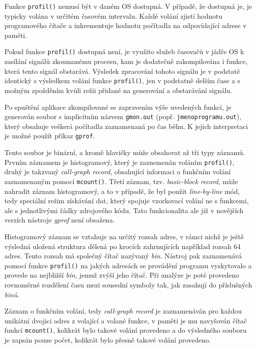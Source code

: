 \documentclass[czech,BP]{thesiskiv}
\begin{document}
Funkce \texttt{profil()} nemusí být v daném OS dostupná. V případě, že dostupná je, je typicky volána v určitém časovém intervalu. Každé volání zjistí hodnotu programového čítače a inkrementuje hodnotu počítadla na odpovídající adrese v paměti.

Pokud funkce \texttt{profil()} dostupná není, je využito služeb časovačů v jádře OS k zasílání signálů zkoumanému procesu, kam je dodatečně zakompilována i funkce, která tento signál obstarává. Výsledek zpracování tohoto signálu je v podstatě identický s výsledkem volání funkce \texttt{profil()}, jen v podstatně delším čase a s možným zpožděním kvůli režii přidané na generování a obstarávání signálu.

Po spuštění aplikace zkompilované se zapravením výše uvedených funkcí, je generován soubor s implicitním názvem \texttt{gmon.out} (popř. \texttt{jmenoprogramu.out}), který obsahuje veškerá počítadla zaznamenaná po čas běhu. K jejich interpretaci je možné použít příkaz \texttt{gprof}.

Tento soubor je binární, a kromě hlavičky může obsahovat až tři typy záznamů. Prvním záznamem je histogramový, který je zaznemenán voláním \texttt{profil()}, druhý je takzvaný \emph{call-graph record}, obsahující informaci o funkčním volání zaznamenaným pomocí \texttt{mcount()}. Třetí záznam, tzv. \emph{basic-block record}, může nahradit záznam histogramový, a to v případě, že byl použit \emph{line-by-line} mód, tedy speciální režim získávání dat, který spojuje vzorkovací volání ne s funkcemi, ale s jednotlivými řádky zdrojového kódu. Tato funkcionalita ale již v novějších verzích nástroje \emph{gprof} není obsažena\cite{gprof1}.

Histogramový záznam se vztahuje na určitý rozsah adres, v rámci nichž je ještě výsledná uložená struktura dělená po krocích zahrnujících například rozsah 64 adres. Tento rozsah má společný čítač nazývaný \emph{bin}. Nástroj pak zaznamenává pomocí funkce \texttt{profil()} na jakých adresách se provádění programu vyskytovalo a provede  na nejbližší \emph{bin}, jemuž zvýší jeho čítač. Při analýze je poté provedeno rovnoměrné rozdělení času mezi sousední symboly tak, jak zasahují do příslušných \emph{binů}.

Záznam o funkčním volání, tedy \emph{call-graph record} je zaznamenáván pro každou unikátní dvojici adres z volající a volané funkce, v paměti je mu navyšován čítač funkcí \texttt{mcount()}, kolikrát bylo takové volání provedeno a do výsledného souboru je zapsán pouze počet, kolikrát bylo přesně takové volání provedeno.
\end{document}
